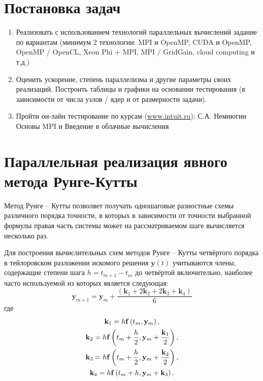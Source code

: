 \documentclass[14pt,final,titlepage,pscyr]{hedwork}
\renewcommand{\vec}[1]{\mathbf{#1}}
\begin{document}
\maketitle
\tableofcontents
\section{Постановка задач}
	\begin{enumerate}
		\item Реализовать с использованием технологий параллельных вычислений задание по вариантам 
			(минимум 2 технологии: MPI и OpenMP, CUDA и OpenMP, OpenMP / OpenCL, Xeon Phi + MPI, 
			MPI / GridGain, cloud computing и т.д.)
		\item Оценить ускорение, степень параллелизма и другие параметры своих реализаций. Построить 
			таблицы и графики на основании тестирования (в зависимости от числа узлов / ядер и от 
			размерности задачи).
		\item Пройти он-лайн тестирование по курсам (\url{www.intuit.ru}): С.А. Немнюгин Основы MPI и 
			Введение в облачные вычисления 
	\end{enumerate}

\section{Параллельная реализация явного метода Рунге-Кутты}
	Метод Рунге -- Кутты позволяет получать одношаговые разностные схемы различного порядка точности, в 
	которых в зависимости от точности выбранной формулы правая часть системы может на рассматриваемом шаге 
	вычисляется несколько раз.

	Для построения вычислительных схем методов Рунге -- Кутты четвёртого порядка в тейлоровском разложении 
	искомого решения \( \vec{y}(t) \) учитываются члены, содержащие степени шага \( h = t_{m+1} - t_m \) до 
	четвёртой включительно, наиболее часто используемой из которых является следующая:
	\begin{equation}
		\vec{y}_{m+1} = \vec{y}_m + \frac{\left( \vec{k}_1 + 2\vec{k}_2 + 2\vec{k}_3 + \vec{k}_4 \right)}{6}
		\label{eq8.9}
	\end{equation}
	где 
	\begin{gather}
		\vec{k}_1 = h\vec{f}\left(t_m, \vec{y}_m \right), \notag \\
		\vec{k}_2 = h\vec{f}\left(t_m + \frac{h}{2}, \vec{y}_m + \frac{\vec{k}_1}{2} \right), \notag \\
		\vec{k}_3 = h\vec{f}\left(t_m + \frac{h}{2}, \vec{y}_m + \frac{\vec{k}_2}{2} \right), \notag \\
		\vec{k}_4 = h\vec{f}\left(t_m + h, \vec{y}_m + \vec{k}_3 \right). \notag
	\end{gather}
\end{document}
